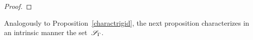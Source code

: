 \begin{proof}
\end{proof}

Analogously to Proposition~\ref{charactrigid}, the next proposition characterizes in an intrinsic manner the set~$\mathcal{S}_\Gamma$.

